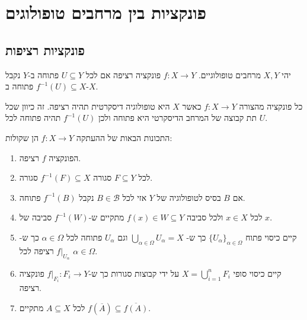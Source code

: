 \documentclass{tstextbook}
\begin{document}
\chapter{פונקציות בין מרחבים טופולוגים}

\section{פונקציות רציפות}

\begin{definition}
יהי \(X,Y\) מרחבים טופולוגיים. \(f:X\to Y\) פונקציה רציפה אם לכל \(U \subseteq Y\) פתוחה ב-\(Y\) נקבל \(f^{-1}(U)\subseteq X\) פתוחה ב-\(X\).

\end{definition}
\begin{example}
כל פונקציה מהצורה \(f:X\to Y\) כאשר \(X\) היא טופולוגיה דיסקרטית תהיה רציפה. זה כיוון שכל תת קבוצה של המרחב הדיסקרטי היא פתוחה ולכן \(f^{-1}(U)\) תהיה פתוחה לכל \(U\).

\end{example}
\begin{proposition}
התכונות הבאות של ההעתקה \(f:X\to Y\) הן שקולות:

  \begin{enumerate}
    \item הפונקציה \(f\) רציפה. 


    \item לכל \(F\subseteq Y\) סגורה \(f^{-1}(F)\subseteq X\) סגורה. 


    \item אם \(B\) בסיס לטופולוגיה של \(Y\) אזי לכל \(B \in \mathcal{B}\) נקבל \(f^{-1}(B)\) פתוחה. 


    \item לכל \(x \in X\) ולכל סביבה \(f(x) \in W\subseteq Y\) מתקיים ש-\(f^{-1}(W)\) סביבה של \(x\). 


    \item קיים כיסוי פתוח \(\{ U_{\alpha} \}_{\alpha \in \Omega}\) כך ש- \(\bigcup_{\alpha \in \Omega}U_{\alpha}=X\) וגם \(U_{\alpha}\) פתוחה לכל \(\alpha \in \Omega\) כך ש-\(f|_{U_{\alpha}}\) רציפה לכל \(\alpha \in \Omega\). 


    \item קיים כיסוי סופי \(X=\bigcup_{i=1}^{n}F_{i}\) על ידי קבוצות סגורות כך ש-\(f|_{F_{i}}:F_{i}\to Y\) פונקציה רציפה. 


    \item לכל \(A\subseteq X\) מתקיים \(f(\overline{A})\subseteq \overline{f(A)}\). 


  \end{enumerate}
\end{proposition}
\end{document}
